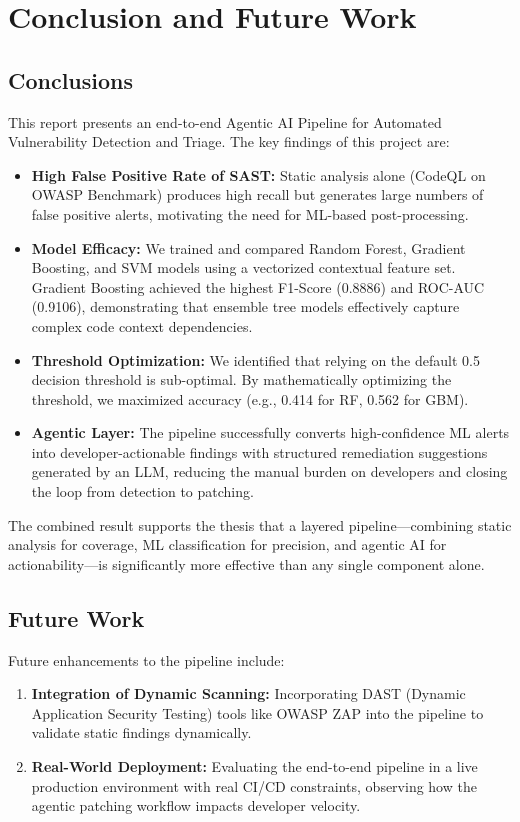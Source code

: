 \chapter{Conclusion and Future Work}
\label{ch:conclusion}

\section{Conclusions}

This report presents an end-to-end Agentic AI Pipeline for Automated Vulnerability Detection
and Triage. The key findings of this project are:

\begin{itemize}
  \item \textbf{High False Positive Rate of SAST:} Static analysis alone (CodeQL on OWASP Benchmark) produces high recall
        but generates large numbers of false positive alerts, motivating the need for ML-based
        post-processing.
  \item \textbf{Model Efficacy:} We trained and compared Random Forest, Gradient Boosting, and SVM models using a vectorized contextual feature set. Gradient Boosting achieved the highest F1-Score (0.8886) and ROC-AUC (0.9106), demonstrating that ensemble tree models effectively capture complex code context dependencies.
  \item \textbf{Threshold Optimization:} We identified that relying on the default 0.5 decision threshold is sub-optimal. By mathematically optimizing the threshold, we maximized accuracy (e.g., 0.414 for RF, 0.562 for GBM).
  \item \textbf{Agentic Layer:} The pipeline successfully converts high-confidence ML alerts into
        developer-actionable findings with structured remediation suggestions generated by an LLM, reducing the manual burden on developers and closing the loop from detection to patching.
\end{itemize}

The combined result supports the thesis that a layered pipeline—combining static
analysis for coverage, ML classification for precision, and agentic AI for
actionability—is significantly more effective than any single component alone.

\section{Future Work}

Future enhancements to the pipeline include:
\begin{enumerate}
  \item \textbf{Integration of Dynamic Scanning:} Incorporating DAST (Dynamic Application Security Testing) tools like OWASP ZAP into the pipeline to validate static findings dynamically.
  \item \textbf{Real-World Deployment:} Evaluating the end-to-end pipeline in a live production environment with real CI/CD constraints, observing how the agentic patching workflow impacts developer velocity.
\end{enumerate}
